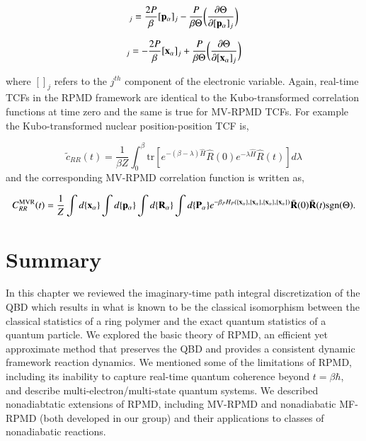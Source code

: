 \documentclass[phd,tocprelim]{cornell}
\begin{document}
\begin{equation}
[ \dot{{\bf{x}}}_{\alpha}]_j = \frac{2P}{\beta}[{\bf{p}}_{\alpha} ]_j  -\frac{P}{\beta \Theta} \bigg( \frac{\partial \Theta}{\partial [{\bf{p}}_{\alpha} ]_j}\bigg)
\end{equation}

\begin{equation}
[ \dot{{\bf{p}}}_{\alpha}]_j = -\frac{2P}{\beta}[{\bf{x}}_{\alpha} ]_j +\frac{P}{\beta \Theta} \bigg( \frac{\partial \Theta}{\partial [{\bf{x}}_{\alpha} ]_j}\bigg)
\end{equation}


where $[]_j$ refers to the $j^{th}$ component of the electronic variable. Again, real-time TCFs in the RPMD framework are identical to the Kubo-transformed correlation functions at time zero and the same is true for MV-RPMD TCFs. For example the Kubo-transformed nuclear position-position TCF is, 

\begin{equation}
\tilde{c}_{RR}(t) = \frac{1}{\beta Z} \int_{0}^{\beta} \textrm{tr}[e^{-(\beta -\lambda)\hat{H}}\hat{R}(0)e^{-\lambda \hat{H}} \hat{R}(t)]d\lambda
\end{equation}
and the corresponding MV-RPMD correlation function is written as, 

\begin{equation}
C_{RR}^{\textrm{MVR}} (t) =\frac{1}{Z} \int d\{ {\bf{x}}_{\alpha} \} \int d\{ {\bf{p}}_{\alpha}\} \int d\{ {\bf{R}}_{\alpha}\} \int d\{ {\bf{P}}_{\alpha}\} e^{-\beta_P H_P(\{ {\bf{x}}_{\alpha} \},\{ {\bf{x}}_{\alpha} \},\{ {\bf{x}}_{\alpha} \},\{ {\bf{x}}_{\alpha} \})} \bar{{\bf{R}}}(0)\bar{{\bf{R}}}(t)\textrm{sgn}(\Theta).
\end{equation}
\section{Summary}
In this chapter we reviewed the imaginary-time path integral discretization of the QBD which results in what is known to be the classical isomorphism between the classical statistics of a ring polymer and the exact quantum statistics of a quantum particle. We explored the basic theory of RPMD, an efficient yet approximate method that preserves the QBD and provides a consistent dynamic framework reaction dynamics. We mentioned some of the limitations of RPMD, including its inability to capture real-time quantum coherence beyond $t= \beta \hbar$, and describe multi-electron/multi-state quantum systems. We described nonadiabtatic extensions of RPMD, including MV-RPMD and nonadiabatic MF-RPMD (both developed in our group) and their applications to classes of nonadiabatic reactions. 
\end{document}
